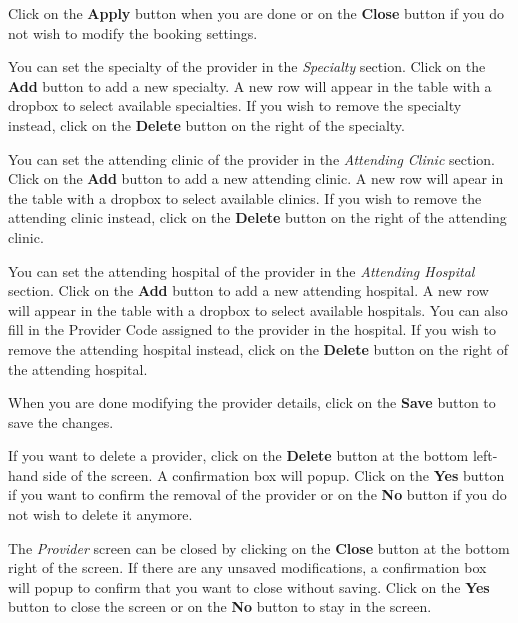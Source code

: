 \documentclass[../main/main]{subfiles}
\begin{document}
Click on the \textbf{Apply} button when you are done or on the \textbf{Close}
button if you do not wish to modify the booking settings.

You can set the specialty of the provider in the \emph{Specialty} section.
Click on the \textbf{Add} button to add a new specialty. A new row will appear
in the table with a dropbox to select available specialties. If you wish to
remove the specialty instead, click on the \textbf{Delete} button on the right
of the specialty.

\pagebreak
You can set the attending clinic of the provider in the \emph{Attending Clinic}
section. Click on the \textbf{Add} button to add a new attending clinic. A new
row will apear in the table with a dropbox to select available clinics. If you
wish to remove the attending clinic instead, click on the \textbf{Delete} button
on the right of the attending clinic.

You can set the attending hospital of the provider in the \emph{Attending
Hospital} section. Click on the \textbf{Add} button to add a new attending
hospital. A new row will appear in the table with a dropbox to select available
hospitals. You can also fill in the Provider Code assigned to the provider in
the hospital. If you wish to remove the attending hospital instead, click on
the \textbf{Delete} button on the right of the attending hospital.

When you are done modifying the provider details, click on the \textbf{Save}
button to save the changes.

If you want to delete a provider, click on the \textbf{Delete} button at the
bottom left-hand side of the screen. A confirmation box will popup.
Click on the \textbf{Yes} button if you want to confirm the removal of the
provider or on the \textbf{No} button if you do not wish to delete it anymore.

The \emph{Provider} screen can be closed by clicking on the
\textbf{Close} button at the bottom right of the screen. If there are any
unsaved modifications, a confirmation box will popup to confirm that you want
to close without saving. Click on the \textbf{Yes} button to close the screen
or on the \textbf{No} button to stay in the screen.
\end{document}
